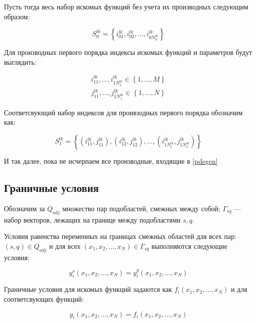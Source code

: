 \documentclass[a4paper,12pt]{article}
\begin{document}
  Пусть тогда весь набор искомых функций без учета их производных
  следующим образом:

  \begin{equation*}
    S_0^{lk} =
    \left\{i_{01}^{lk},i_{02}^{lk},\ldots,i_{0N_0^{lk}}^{lk} \right\}
  \end{equation*}


  Для производных первого порядка индексы искомых функций и параметров
  будут выглядить:

  \begin{eqnarray*}
    i_{11}^{lk},\ldots,i_{1N_1^{lk}}^{lk} \in \left\{
    1,\ldots,M\right\}\\
    j_{11}^{lk},\ldots,j_{1N_1^{lk}}^{lk} \in \left\{
    1,\ldots,N\right\}
  \end{eqnarray*}

  Соответсвующий набор индексов для проивзодных первого порядка
  обозначим как:

  \begin{equation*}
    S_1^{lk} =
    \left\{\left(i_{11}^{lk},j_{11}^{lk}\right),\left(i_{12}^{lk},j_{12}^{lk}\right),
    \ldots,\left(i_{1N_1^{lk}}^{lk},j_{1N_1^{lk}}^{lk}\right) \right\}
  \end{equation*}

  И так далее, пока не исчерпаем все производные, входящие в \eqref{pdegen}
  

  \subsection{Граничные условия}

  Обозначим за $Q_{adj}$ множество пар подобластей, смежных между
  собой; $\Gamma_{sq}$ --- набор векторов, лежащих на границе между
  подобластями $s,q$.
  
  Условия равенства переменных на границах смежных областей для всех
  пар: $(s,q) \in Q_{adj}$ и для всех $\left(x_1,x_2,\ldots,x_N\right)
  \in \Gamma_{sq}$ выполняются следующие условия:

  \begin{equation}
    y_i^s\left(x_1,x_2,\ldots,x_N\right) = y_i^q\left(x_1,x_2,\ldots,x_N\right)
  \end{equation}

  Граничные условия для искомых функций задаются как 
  $f_i\left(x_1,x_2,\ldots,x_N\right)$ и для соответсвующих функций:

  \begin{equation}
    y_i\left(x_1,x_2,\ldots,x_N\right) = f_i\left(x_1,x_2,\ldots,x_N\right)
  \end{equation}
  
\end{document}
